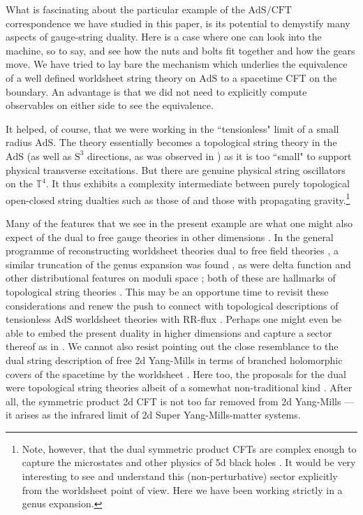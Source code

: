 \documentclass[12pt,a4paper]{article}
\begin{document}
What is fascinating about the particular example of the $\text{AdS}/\text{CFT}$ correspondence we have studied in this paper, is its potential to demystify many aspects of gauge-string duality. Here is a case where one can look into the machine, so to say, and see how the nuts and bolts fit together and how the gears move. We have tried to lay bare the mechanism which underlies the equivalence of a well defined worldsheet string theory on $\text{AdS}$ to a spacetime CFT on the boundary. An advantage is that we did not need to explicitly compute observables on either side to see the equivalence. 

It helped, of course, that we were working in the ``tensionless" limit of a small radius $\text{AdS}$. The theory essentially becomes a topological string theory in the $\text{AdS}$ (as well as $\text{S}^3$ directions, as was observed in \cite{Eberhardt:2018ouy}) as it is too ``small" to support physical transverse excitations. But there are genuine physical string oscillators on the $\mathbb{T}^4$. It thus exhibits a complexity intermediate between purely topological open-closed string dualties such as those of \cite{Gopakumar:1998ki, Gaiotto:2003yb, Razamat:2008zr, Gopakumar:2011ev} and those with propagating gravity.\footnote{Note, however, that the dual symmetric product CFTs are complex enough to capture the microstates and other physics of 5d black holes \cite{Strominger:1996sh, Maldacena:1996ky, David:2002wn}. It would be very interesting to see and understand this (non-perturbative) sector explicitly from the worldsheet point of view. Here we have been working strictly in a genus expansion.}

Many of the features that we see in the present example are what one might also expect of the dual to free gauge theories in other dimensions \cite{Sundborg:2000wp, Witten, Mikhailov:2002bp}. In the general programme of reconstructing worldsheet theories dual to free field theories \cite{Gopakumar:2003ns, Gopakumar:2004qb, Gopakumar:2005fx}, a similar truncation of the genus expansion was found \cite{Aharony:2006th}, as were delta function and other distributional features on moduli space \cite{Aharony:2007fs, Razamat:2008zr, Gopakumar:2011ev, Gopakumar:2012ny}; both of these are hallmarks of topological string theories \cite{Distler:1989ax, Verlinde:1990ku, Bershadsky:1993ta}. This may be an opportune time to revisit these considerations and renew the push to connect with topological descriptions of tensionless $\text{AdS}$ worldsheet theories with RR-flux \cite{Berkovits:2008qc, Berkovits:2019ulm}. Perhaps one might even be able to embed the present duality in higher dimensions and capture a sector thereof as in \cite{Costello:2018zrm}. We cannot also resist pointing out the close resemblance to the dual string description of free 2d Yang-Mills in terms of branched holomorphic covers of the spacetime by the worldsheet \cite{Gross:1992tu, Gross:1993hu}. Here too, the proposals for the dual were topological string theories albeit of a somewhat non-traditional kind \cite{Horava:1993aq,Cordes:1994sd}. After all, the symmetric product 2d CFT is not too far removed from 2d Yang-Mills --- it arises as the infrared limit of 2d Super Yang-Mills-matter systems.  
\end{document}
